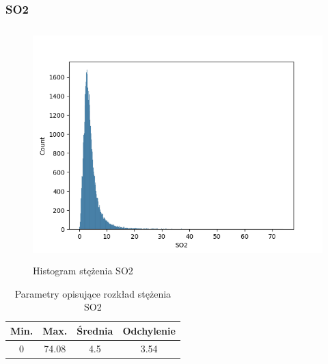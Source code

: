 \documentclass[18pt, letterpaper]{article}
\begin{document}
\subsubsection{SO2}
\begin{figure}[H]
\centering
\includegraphics[width=120mm, height=90mm]{visualisations/histograms/SO2_hist.png}
\caption{Histogram stężenia SO2}
\end{figure}
\begin{table}[H]
\centering
\begin{tabular}{|c|c|c|c|}
\hline
Min.  & Max. & Średnia & Odchylenie \\ \hline
0 & 74.08 & 4.5   & 3.54      \\ \hline
\end{tabular}
\caption{Parametry opisujące rozkład stężenia SO2}
\end{table}
\end{document}
